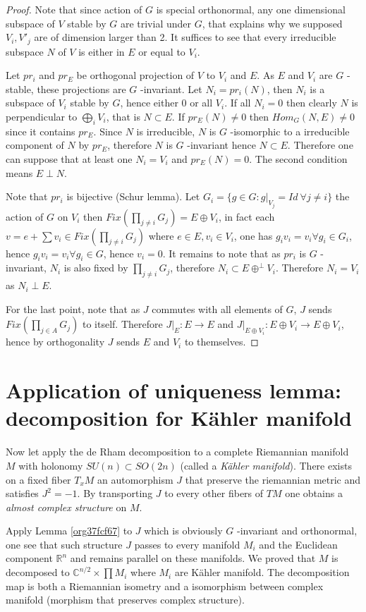 \documentclass[11pt]{article}
\begin{document}
\begin{proof}
Note that since action of \(G\) is special orthonormal, any one dimensional subspace of \(V\) stable by
\(G\) are trivial under \(G\), that explains why we supposed \(V_i, V'_j\) are of dimension larger
than 2. It suffices to see that every irreducible subspace \(N\) of \(V\) is either in \(E\) or equal to
\(V_i\).

Let \(pr_i\) and \(pr_E\) be orthogonal projection of \(V\) to \(V_i\) and \(E\). As \(E\) and \(V_i\) are \(G\) -stable, these
projections are \(G\) -invariant. Let \(N_i = pr_i(N)\), then \(N_i\) is a subspace of \(V_i\) stable
by \(G\), hence either \(0\) or all \(V_i\). If all \(N_i=0\) then clearly \(N\) is perpendicular to \(\bigoplus_i
V_i\), that is \(N\subset E\). If \(pr_E(N)\ne 0\) then \(Hom_G(N, E) \ne 0\) since it contains \(pr_E\). Since
\(N\) is irreducible, \(N\) is \(G\) -isomorphic to a irreducible component of \(N\) by \(pr_E\), therefore
\(N\) is \(G\) -invariant hence \(N\subset E\). Therefore one can suppose that at least one \(N_i = V_i\) and
\(pr_E(N) = 0\). The second condition means \(E\perp N\). 

Note that \(pr_i\) is bijective (Schur lemma). 
Let \(G_i = \{g\in G: g|_{V_j} = Id\ \forall j\ne i \}\) the action of \(G\) on \(V_i\)
then \(Fix(\prod_{j\ne i} G_j)= E\oplus V_i\), in fact each \(v = e +\sum v_i\in Fix(\prod_{j\ne i}
G_j)\) where \(e\in E, v_i\in V_i\), one has \(g_i v_i = v_i \forall g_i \in G_i\), hence \(g_i v_i = v_i
\forall g_i\in G\), hence \(v_i = 0\). It remains to note that as \(pr_i\) is \(G\) -invariant, \(N_i\) is
also fixed by \(\prod_{j\ne i}G_j\), therefore \(N_i\subset E \oplus^\perp V_i\). Therefore \(N_i=V_i\) as
\(N_i\perp E\).

For the last point, note that as \(J\) commutes with all elements of \(G\), \(J\) sends \(Fix(\prod_{j\in
A} G_j)\) to itself. Therefore \(J|_E: E\longrightarrow E\) and \(J|_{E\oplus V_i}: E\oplus
V_i\longrightarrow E\oplus V_i\), hence by orthogonality \(J\) sends \(E\) and \(V_i\) to themselves.
\end{proof}


\section{Application of uniqueness lemma: decomposition for Kähler manifold}
\label{sec:org72bd06c}
Now let apply the de Rham decomposition to a complete Riemannian manifold \(M\) with holonomy \(SU(n)
\subset SO(2n)\) (called a \emph{Kähler manifold}). There exists on a fixed fiber \(T_xM\) an automorphism
\(J\) that preserve the riemannian metric and satisfies \(J^2 = -1\). By transporting \(J\) to every other
fibers of \(TM\) one obtains a \emph{almost complex structure} on \(M\).

Apply Lemma \ref{org37fcf67} to \(J\) which is obviously \(G\) -invariant and orthonormal, one
see that such structure \(J\) passes to every manifold \(M_i\) and the Euclidean component \(\mathbb{R}^n\) and
remains parallel on these manifolds. We proved that \(M\) is decomposed to \(\mathbb{C}^{n/2}\times
\prod M_i\) where \(M_i\) are Kähler manifold. The decomposition map is both a Riemannian isometry and
a isomorphism between complex manifold (morphism that preserves complex structure). 
\end{document}
